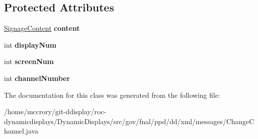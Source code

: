\subsection*{Protected Attributes}
\begin{DoxyCompactItemize}
\item 
\hypertarget{classgov_1_1fnal_1_1ppd_1_1dd_1_1xml_1_1messages_1_1ChangeChannel_ac1cdeb8cb138207ad9bb06736d203472}{\hyperlink{interfacegov_1_1fnal_1_1ppd_1_1dd_1_1signage_1_1SignageContent}{Signage\-Content} {\bfseries content}}\label{classgov_1_1fnal_1_1ppd_1_1dd_1_1xml_1_1messages_1_1ChangeChannel_ac1cdeb8cb138207ad9bb06736d203472}

\item 
\hypertarget{classgov_1_1fnal_1_1ppd_1_1dd_1_1xml_1_1messages_1_1ChangeChannel_aeb707b3119b070f821235e61961d17f8}{int {\bfseries display\-Num}}\label{classgov_1_1fnal_1_1ppd_1_1dd_1_1xml_1_1messages_1_1ChangeChannel_aeb707b3119b070f821235e61961d17f8}

\item 
\hypertarget{classgov_1_1fnal_1_1ppd_1_1dd_1_1xml_1_1messages_1_1ChangeChannel_aa93c4b773d4d0fab155d8206d4d385ff}{int {\bfseries screen\-Num}}\label{classgov_1_1fnal_1_1ppd_1_1dd_1_1xml_1_1messages_1_1ChangeChannel_aa93c4b773d4d0fab155d8206d4d385ff}

\item 
\hypertarget{classgov_1_1fnal_1_1ppd_1_1dd_1_1xml_1_1messages_1_1ChangeChannel_a6915c9d80fca444cbf5ec21f23295627}{int {\bfseries channel\-Number}}\label{classgov_1_1fnal_1_1ppd_1_1dd_1_1xml_1_1messages_1_1ChangeChannel_a6915c9d80fca444cbf5ec21f23295627}

\end{DoxyCompactItemize}


The documentation for this class was generated from the following file\-:\begin{DoxyCompactItemize}
\item 
/home/mccrory/git-\/ddisplay/roc-\/dynamicdisplays/\-Dynamic\-Displays/src/gov/fnal/ppd/dd/xml/messages/Change\-Channel.\-java\end{DoxyCompactItemize}

